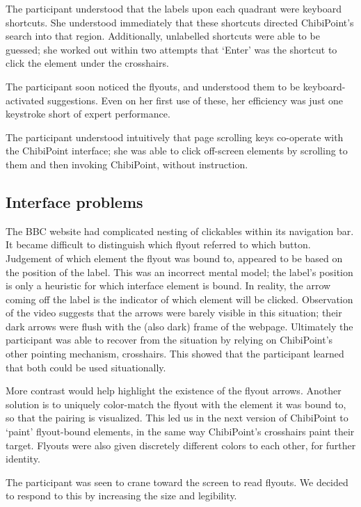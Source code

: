 \documentclass[11pt,openright,a4paper]{report}
\begin{document}
The participant understood that the labels upon each quadrant were keyboard shortcuts. She understood immediately that these shortcuts directed ChibiPoint's search into that region. Additionally, unlabelled shortcuts were able to be guessed; she worked out within two attempts that `Enter' was the shortcut to click the element under the crosshairs.

The participant soon noticed the flyouts, and understood them to be keyboard-activated suggestions. Even on her first use of these, her efficiency was just one keystroke short of expert performance.

The participant understood intuitively that page scrolling keys co-operate with the ChibiPoint interface; she was able to click off-screen elements by scrolling to them and then invoking ChibiPoint, without instruction.

\subsection{Interface problems}
The BBC website had complicated nesting of clickables within its navigation bar. It became difficult to distinguish which flyout referred to which button. Judgement of which element the flyout was bound to, appeared to be based on the position of the label. This was an incorrect mental model; the label's position is only a heuristic for which interface element is bound. In reality, the arrow coming off the label is the indicator of which element will be clicked. Observation of the video suggests that the arrows were barely visible in this situation; their dark arrows were flush with the (also dark) frame of the webpage. Ultimately the participant was able to recover from the situation by relying on ChibiPoint's other pointing mechanism, crosshairs. This showed that the participant learned that both could be used situationally.

More contrast would help highlight the existence of the flyout arrows. Another solution is to uniquely color-match the flyout with the element it was bound to, so that the pairing is visualized. This led us in the next version of ChibiPoint to `paint' flyout-bound elements, in the same way ChibiPoint's crosshairs paint their target. Flyouts were also given discretely different colors to each other, for further identity.

The participant was seen to crane toward the screen to read flyouts. We decided to respond to this by increasing the size and legibility.
\end{document}
